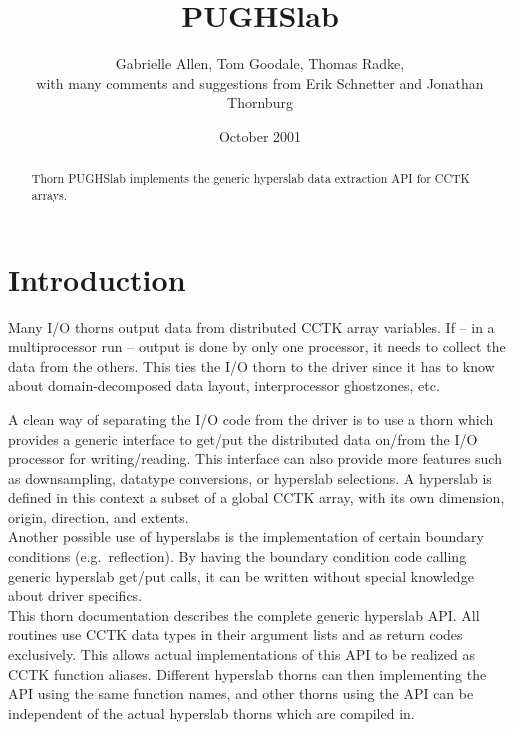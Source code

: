 \documentclass{article}
\begin{document}
\title{PUGHSlab}
\author{Gabrielle Allen, Tom Goodale, Thomas Radke,\\
with many comments and suggestions from Erik Schnetter and Jonathan Thornburg}
\date{October 2001}

\maketitle


\begin{abstract}
Thorn PUGHSlab implements the generic hyperslab data extraction API for CCTK arrays.
\end{abstract}

\section{Introduction}

Many I/O thorns output data from distributed CCTK array variables.
If -- in a multiprocessor run -- output is done by only one processor, it needs to collect the
data from the others. This ties the I/O thorn to the driver
since it has to know about domain-decomposed data layout, interprocessor
ghostzones, etc.

A clean way of separating the I/O code from the driver is to use
a thorn which provides a generic interface to get/put the distributed
data on/from the I/O processor for writing/reading. This interface can also
provide more features such as downsampling, datatype conversions,
or hyperslab selections. A hyperslab is defined in this context a subset of a
global CCTK array, with its own dimension, origin, direction, and extents.\\

Another possible use of hyperslabs is the implementation of certain boundary
conditions (e.g.\ reflection). By having the boundary condition code calling
generic hyperslab get/put calls, it can be written without special knowledge
about driver specifics.\\

This thorn documentation describes the complete generic hyperslab API.
All routines use CCTK data types in their argument lists and as return codes
exclusively. This allows actual implementations of this API to be realized as
CCTK function aliases. Different hyperslab thorns can then implementing the API
using the same function names, and other thorns using the API can be independent
of the actual hyperslab thorns which are compiled in.\\
\end{document}
